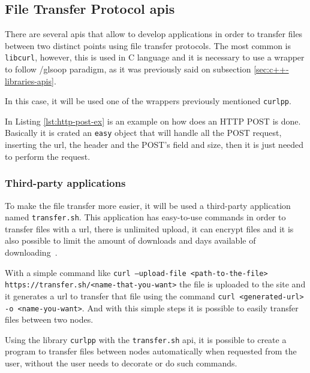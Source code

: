 \subsection{File Transfer Protocol \gls{api}s}
\label{sub-sec:ftp-apis}
There are several \gls{api}s that allow to develop applications in order to transfer files between two distinct points using file transfer protocols. The most common is \texttt{libcurl}, however, this is used in C language and it is necessary to use a wrapper to follow /gls{oop} paradigm, as it was previously said on subsection \ref{sec:c++-libraries-apis}.

In this case, it will be used one of the wrappers previously mentioned \texttt{curlpp}.

In Listing \ref{lst:http-post-ex} is an example on how does an HTTP POST is done. Basically it is crated an \texttt{easy} object that will handle all the POST request, inserting the \gls{url}, the header and the POST's field and size, then it is just needed to perform the request.
%


\subsubsection{Third-party applications}

To make the file transfer more easier, it will be used a third-party application named \texttt{transfer.sh}. This application has easy-to-use commands in order to transfer files with a \gls{url}, there is unlimited upload, it can encrypt files and it is also possible to limit the amount of downloads and days available of downloading~\cite{transfer-sh}.

With a simple command like \texttt{curl --upload-file <path-to-the-file> https://transfer.sh/<name-that-you-want>} the file is uploaded to the site and it generates a \gls{url} to transfer that file using the command \texttt{curl <generated-url> -o <name-you-want>}.
And with this simple steps it is possible to easily transfer files between two nodes.

Using the library \texttt{curlpp} with the \texttt{transfer.sh} \gls{api}, it is possible to create a program to transfer files between nodes automatically when requested from the user, without the user needs to decorate or do such commands.
%
